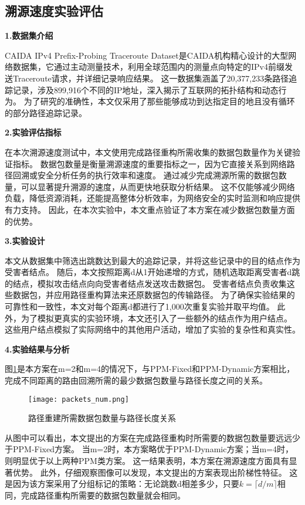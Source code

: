 \subsection{溯源速度实验评估}
\textbf{1.数据集介绍}\par
CAIDA IPv4 Prefix-Probing Traceroute Dataset是CAIDA机构精心设计的大型网络数据集，它通过主动测量技术，利用全球范围内的测量点向特定的IPv4前缀发送Traceroute请求，并详细记录响应结果。
这一数据集涵盖了20,377,233条路径追踪记录，涉及899,916个不同的IP地址，深入揭示了互联网的拓扑结构和动态行为。
为了研究的准确性，本文仅采用了那些能够成功到达指定目的地且没有循环的部分路径追踪记录。
\par
\textbf{2.实验评估指标}\par
在本次溯源速度测试中，本文使用完成路径重构所需收集的数据包数量作为关键验证指标。
数据包数量是衡量溯源速度的重要指标之一，因为它直接关系到网络路径回溯或安全分析任务的执行效率和速度。
通过减少完成溯源所需的数据包数量，可以显著提升溯源的速度，从而更快地获取分析结果。
这不仅能够减少网络负载，降低资源消耗，还能提高整体分析效率，为网络安全的实时监测和响应提供有力支持。
因此，在本次实验中，本文重点验证了本方案在减少数据包数量方面的优势。\par

\textbf{3.实验设计}\par
本文从数据集中筛选出跳数达到最大的追踪记录，并将这些记录中的目的结点作为受害者结点。
随后，本文按照距离d从1开始递增的方式，随机选取距离受害者d跳的结点，模拟攻击结点向向受害者结点发送攻击数据包。
受害者结点负责收集这些数据包，并应用路径重构算法来还原数据包的传输路径。
为了确保实验结果的可靠性和一致性，本文对每个距离d都进行了1,000次重复实验并取平均值。
此外，为了模拟更真实的实验环境，本文还引入了一些额外的结点作为用户结点。
这些用户结点模拟了实际网络中的其他用户活动，增加了实验的复杂性和真实性。\par

\textbf{4.实验结果与分析}\par
图\ref{fig:packets_num}是本方案在m=2和m=4的情况下，与PPM-Fixed和PPM-Dynamic方案相比，完成不同距离的路由回溯所需的最少数据包数量与路径长度之间的关系。
\begin{figure}[htbp]
	\centering
	\texttt{[image: packets\_num.png]}
	\caption{路径重建所需数据包数量与路径长度关系}
	\label{fig:packets_num}
\end{figure}
从图中可以看出，本文提出的方案在完成路径重构时所需要的数据包数量要远远少于PPM-Fixed方案。
当m=2时，本方案略优于PPM-Dynamic方案；当m=4时，则明显优于以上两种PPM类方案。
这一结果表明，本方案在溯源速度方面具有显著优势。
此外，仔细观察图像可以发现，本文提出的方案表现出阶梯性特征。
这是因为该方案采用了分组标记的策略：无论跳数d相差多少，只要$k=\lceil d/m \rceil$相同，完成路径重构所需要的数据包数量就会相同。\par

